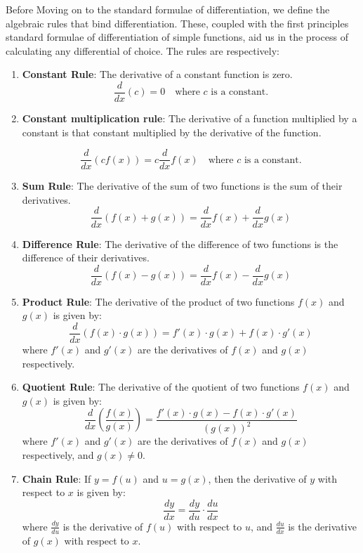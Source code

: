 Before Moving on to the standard formulae of differentiation, we define the algebraic rules that bind differentiation. These, coupled with the first principles standard formulae of differentiation of simple functions, aid us in the process of calculating any differential of choice. 
The rules are respectively:

\begin{enumerate}
    \item \textbf{Constant Rule}: The derivative of a constant function is zero.
    \[
    \frac{d}{dx}(c) = 0 \quad \text{where } c \text{ is a constant.}
    \]

    \item \textbf{Constant multiplication rule}: The derivative of a function multiplied by a constant is that constant multiplied by the derivative of the function.

    \[
    \frac{d}{dx}(cf(x)) = c\frac{d}{dx}f(x) \quad \text{where } c \text{ is a constant.}
    \]
    
    \item \textbf{Sum Rule}: The derivative of the sum of two functions is the sum of their derivatives.
    \[
    \frac{d}{dx}(f(x) + g(x)) = \frac{d}{dx}f(x) + \frac{d}{dx}g(x)
    \]
    
    \item \textbf{Difference Rule}: The derivative of the difference of two functions is the difference of their derivatives.
    \[
    \frac{d}{dx}(f(x) - g(x)) = \frac{d}{dx}f(x) - \frac{d}{dx}g(x)
    \]
    
    \item \textbf{Product Rule}: The derivative of the product of two functions $f(x)$ and $g(x)$ is given by:
    \[
    \frac{d}{dx}(f(x) \cdot g(x)) = f'(x) \cdot g(x) + f(x) \cdot g'(x)
    \]
    where $f'(x)$ and $g'(x)$ are the derivatives of $f(x)$ and $g(x)$ respectively.
    
    \item \textbf{Quotient Rule}: The derivative of the quotient of two functions $f(x)$ and $g(x)$ is given by:
    \[
    \frac{d}{dx}\left(\frac{f(x)}{g(x)}\right) = \frac{f'(x) \cdot g(x) - f(x) \cdot g'(x)}{(g(x))^2}
    \]
    where $f'(x)$ and $g'(x)$ are the derivatives of $f(x)$ and $g(x)$ respectively, and $g(x) \neq 0$.
    
    \item \textbf{Chain Rule}: If $y = f(u)$ and $u = g(x)$, then the derivative of $y$ with respect to $x$ is given by:
    \[
    \frac{dy}{dx} = \frac{dy}{du} \cdot \frac{du}{dx}
    \]
    where $\frac{dy}{du}$ is the derivative of $f(u)$ with respect to $u$, and $\frac{du}{dx}$ is the derivative of $g(x)$ with respect to $x$.
\end{enumerate}

